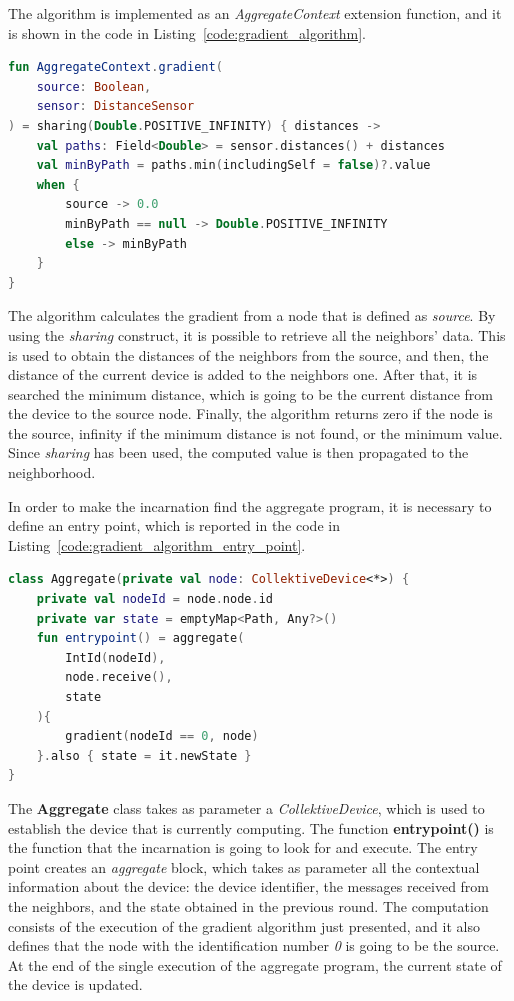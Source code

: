 The algorithm is implemented as an \textit{AggregateContext} extension function, and it is shown in the code in Listing~\ref{code:gradient_algorithm}.
\begin{lstlisting}[caption={Gradient algorithm implemented using Collektive}, captionpos=b, language=Kotlin, label={code:gradient_algorithm}]
fun AggregateContext.gradient(
    source: Boolean,
    sensor: DistanceSensor
) = sharing(Double.POSITIVE_INFINITY) { distances ->
    val paths: Field<Double> = sensor.distances() + distances
    val minByPath = paths.min(includingSelf = false)?.value
    when {
        source -> 0.0
        minByPath == null -> Double.POSITIVE_INFINITY
        else -> minByPath
    }
}
\end{lstlisting}
The algorithm calculates the gradient from a node that is defined as \textit{source}. By using the \textit{sharing} construct, it is possible to retrieve all the neighbors' data. This is used to obtain the distances of the neighbors from the source, and then, the distance of the current device is added to the neighbors one. After that, it is searched the minimum distance, which is going to be the current distance from the device to the source node. Finally, the algorithm returns zero if the node is the source, infinity if the minimum distance is not found, or the minimum value.\newline
Since \textit{sharing} has been used, the computed value is then propagated to the neighborhood.

In order to make the incarnation find the aggregate program, it is necessary to define an entry point, which is reported in the code in Listing~\ref{code:gradient_algorithm_entry_point}.
\begin{lstlisting}[caption={Gradient algorithm entry point}, captionpos=b, language=Kotlin, label={code:gradient_algorithm_entry_point}]
class Aggregate(private val node: CollektiveDevice<*>) {
    private val nodeId = node.node.id
    private var state = emptyMap<Path, Any?>()
    fun entrypoint() = aggregate(
        IntId(nodeId), 
        node.receive(),
        state
    ){
        gradient(nodeId == 0, node)
    }.also { state = it.newState }
}
\end{lstlisting}
The \textbf{Aggregate} class takes as parameter a \textit{CollektiveDevice}, which is used to establish the device that is currently computing.\newline
The function \textbf{entrypoint()} is the function that the incarnation is going to look for and execute.\newline
The entry point creates an \textit{aggregate} block, which takes as parameter all the contextual information about the device: the device identifier, the messages received from the neighbors, and the state obtained in the previous round. The computation consists of the execution of the gradient algorithm just presented, and it also defines that the node with the identification number \textit{0} is going to be the source.\newline
At the end of the single execution of the aggregate program, the current state of the device is updated.

